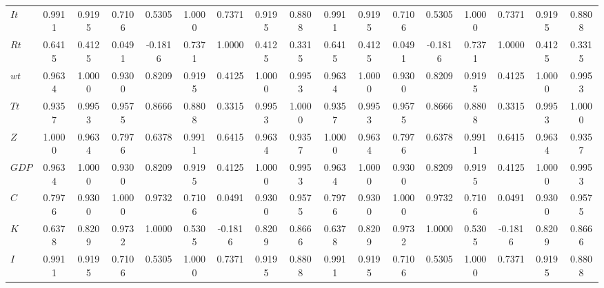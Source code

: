 \begin{center}
\begin{longtable}{lcccccccccccccccc}
$It        $	 & 	    0.9911	 & 	    0.9195	 & 	    0.7106	 & 	    0.5305	 & 	    1.0000	 & 	    0.7371	 & 	    0.9195	 & 	    0.8808	 & 	    0.9911	 & 	    0.9195	 & 	    0.7106	 & 	    0.5305	 & 	    1.0000	 & 	    0.7371	 & 	    0.9195	 & 	    0.8808 \\ 
$Rt        $	 & 	    0.6415	 & 	    0.4125	 & 	    0.0491	 & 	   -0.1816	 & 	    0.7371	 & 	    1.0000	 & 	    0.4125	 & 	    0.3315	 & 	    0.6415	 & 	    0.4125	 & 	    0.0491	 & 	   -0.1816	 & 	    0.7371	 & 	    1.0000	 & 	    0.4125	 & 	    0.3315 \\ 
$wt        $	 & 	    0.9634	 & 	    1.0000	 & 	    0.9300	 & 	    0.8209	 & 	    0.9195	 & 	    0.4125	 & 	    1.0000	 & 	    0.9953	 & 	    0.9634	 & 	    1.0000	 & 	    0.9300	 & 	    0.8209	 & 	    0.9195	 & 	    0.4125	 & 	    1.0000	 & 	    0.9953 \\ 
$Tt        $	 & 	    0.9357	 & 	    0.9953	 & 	    0.9575	 & 	    0.8666	 & 	    0.8808	 & 	    0.3315	 & 	    0.9953	 & 	    1.0000	 & 	    0.9357	 & 	    0.9953	 & 	    0.9575	 & 	    0.8666	 & 	    0.8808	 & 	    0.3315	 & 	    0.9953	 & 	    1.0000 \\ 
$Z         $	 & 	    1.0000	 & 	    0.9634	 & 	    0.7976	 & 	    0.6378	 & 	    0.9911	 & 	    0.6415	 & 	    0.9634	 & 	    0.9357	 & 	    1.0000	 & 	    0.9634	 & 	    0.7976	 & 	    0.6378	 & 	    0.9911	 & 	    0.6415	 & 	    0.9634	 & 	    0.9357 \\ 
$GDP       $	 & 	    0.9634	 & 	    1.0000	 & 	    0.9300	 & 	    0.8209	 & 	    0.9195	 & 	    0.4125	 & 	    1.0000	 & 	    0.9953	 & 	    0.9634	 & 	    1.0000	 & 	    0.9300	 & 	    0.8209	 & 	    0.9195	 & 	    0.4125	 & 	    1.0000	 & 	    0.9953 \\ 
$C         $	 & 	    0.7976	 & 	    0.9300	 & 	    1.0000	 & 	    0.9732	 & 	    0.7106	 & 	    0.0491	 & 	    0.9300	 & 	    0.9575	 & 	    0.7976	 & 	    0.9300	 & 	    1.0000	 & 	    0.9732	 & 	    0.7106	 & 	    0.0491	 & 	    0.9300	 & 	    0.9575 \\ 
$K         $	 & 	    0.6378	 & 	    0.8209	 & 	    0.9732	 & 	    1.0000	 & 	    0.5305	 & 	   -0.1816	 & 	    0.8209	 & 	    0.8666	 & 	    0.6378	 & 	    0.8209	 & 	    0.9732	 & 	    1.0000	 & 	    0.5305	 & 	   -0.1816	 & 	    0.8209	 & 	    0.8666 \\ 
$I         $	 & 	    0.9911	 & 	    0.9195	 & 	    0.7106	 & 	    0.5305	 & 	    1.0000	 & 	    0.7371	 & 	    0.9195	 & 	    0.8808	 & 	    0.9911	 & 	    0.9195	 & 	    0.7106	 & 	    0.5305	 & 	    1.0000	 & 	    0.7371	 & 	    0.9195	 & 	    0.8808 \\ 

\end{longtable}
\end{center}
